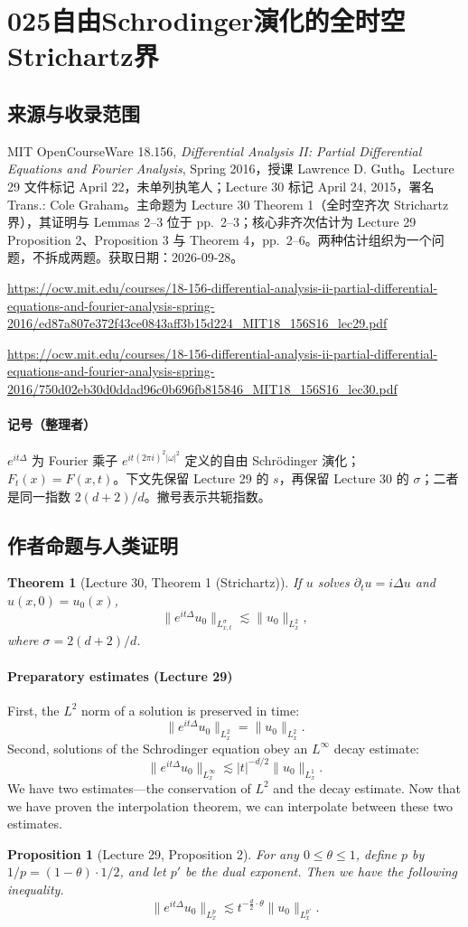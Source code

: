 \documentclass[UTF8,11pt]{ctexart}
\newtheorem*{theorem}{Theorem}
\newtheorem*{proposition}{Proposition}
\theoremstyle{definition}
\begin{document}
\section*{025\quad 自由Schrodinger演化的全时空Strichartz界}
\subsection*{来源与收录范围}
MIT OpenCourseWare 18.156, \emph{Differential Analysis II: Partial Differential Equations and Fourier Analysis}, Spring 2016，授课 Lawrence D. Guth。Lecture 29 文件标记 April 22，未单列执笔人；Lecture 30 标记 April 24, 2015，署名 Trans.: Cole Graham。主命题为 Lecture 30 Theorem 1（全时空齐次 Strichartz 界），其证明与 Lemmas 2--3 位于 pp.~2--3；核心非齐次估计为 Lecture 29 Proposition 2、Proposition 3 与 Theorem 4，pp.~2--6。两种估计组织为一个问题，不拆成两题。获取日期：2026-09-28。
\par\url{https://ocw.mit.edu/courses/18-156-differential-analysis-ii-partial-differential-equations-and-fourier-analysis-spring-2016/ed87a807e372f43ce0843aff3b15d224_MIT18_156S16_lec29.pdf}
\par\url{https://ocw.mit.edu/courses/18-156-differential-analysis-ii-partial-differential-equations-and-fourier-analysis-spring-2016/750d02eb30d0ddad96c0b696fb815846_MIT18_156S16_lec30.pdf}
\paragraph{记号（整理者）} $e^{it\Delta}$ 为 Fourier 乘子 $e^{it(2\pi i)^2|\omega|^2}$ 定义的自由 Schr\"odinger 演化；$F_t(x)=F(x,t)$。下文先保留 Lecture 29 的 $s$，再保留 Lecture 30 的 $\sigma$；二者是同一指数 $2(d+2)/d$。撇号表示共轭指数。
\subsection*{作者命题与人类证明}
\begin{theorem}[Lecture 30, Theorem 1 (Strichartz)]
If $u$ solves $\partial_tu=i\Delta u$ and $u(x,0)=u_0(x)$,
\[\|e^{it\Delta}u_0\|_{L^\sigma_{x,t}}\lesssim\|u_0\|_{L^2_x},\tag{2}\]
where $\sigma=2(d+2)/d$.
\end{theorem}
\paragraph{Preparatory estimates (Lecture 29)}
First, the $L^2$ norm of a solution is preserved in time:
\[\|e^{it\Delta}u_0\|_{L^2_x}=\|u_0\|_{L^2_x}.\]
Second, solutions of the Schrodinger equation obey an $L^\infty$ decay estimate:
\[\|e^{it\Delta}u_0\|_{L^\infty_x}\lesssim|t|^{-d/2}\|u_0\|_{L^1_x}.\]
We have two estimates---the conservation of $L^2$ and the decay estimate. Now that we have proven the interpolation theorem, we can interpolate between these two estimates.
\begin{proposition}[Lecture 29, Proposition 2]
For any $0\leq\theta\leq1$, define $p$ by $1/p=(1-\theta)\cdot1/2$, and let $p'$ be the dual exponent. Then we have the following inequality.
\[\|e^{it\Delta}u_0\|_{L^p_x}\lesssim t^{-\frac d2\cdot\theta}\|u_0\|_{L^{p'}_x}.\]
\end{proposition}
\end{document}
